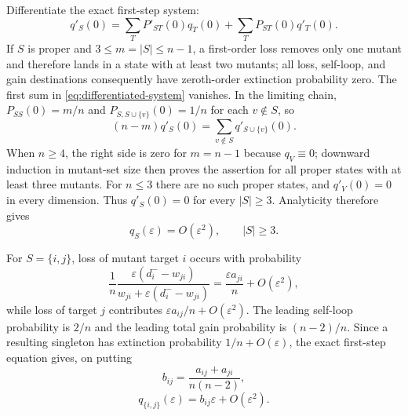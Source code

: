 \documentclass[11pt]{article}
\begin{document}
Differentiate the exact first-step system:
\begin{equation}\label{eq:differentiated-system}
 q'_S(0)=\sum_T P'_{ST}(0)q_T(0)
          +\sum_T P_{ST}(0)q'_T(0).
\end{equation}
If $S$ is proper and $3\le m=|S|\le n-1$, a first-order loss removes only one mutant and therefore lands
in a state with at least two mutants; all loss, self-loop, and gain
destinations consequently have zeroth-order extinction probability zero.
The first sum in \eqref{eq:differentiated-system} vanishes.  In the limiting
chain, $P_{SS}(0)=m/n$ and $P_{S,S\cup\{v\}}(0)=1/n$ for each $v\notin S$, so
\begin{equation}\label{eq:triangular-derivative}
 (n-m)q'_S(0)=\sum_{v\notin S}q'_{S\cup\{v\}}(0).
\end{equation}
When $n\ge4$, the right side is zero for $m=n-1$ because $q_V\equiv0$;
downward induction in mutant-set size then proves the assertion for all proper
states with at least three mutants.  For $n\le3$ there are no such proper
states, and $q'_V(0)=0$ in every dimension.  Thus $q'_S(0)=0$ for every
$|S|\ge3$.  Analyticity
therefore gives
\begin{equation}\label{eq:three-mutant-vanishing}
 q_S(\varepsilon)=O(\varepsilon^2),\qquad |S|\ge3.
\end{equation}

For $S=\{i,j\}$, loss of mutant target $i$ occurs with probability
\[
 \frac1n\frac{\varepsilon(d_i^- -w_{ji})}
 {w_{ji}+\varepsilon(d_i^- -w_{ji})}
 =\frac{\varepsilon a_{ji}}n+O(\varepsilon^2),
\]
while loss of target $j$ contributes $\varepsilon a_{ij}/n+O(\varepsilon^2)$.
The leading self-loop probability is $2/n$ and the
leading total gain probability is $(n-2)/n$.  Since a resulting singleton has
extinction probability $1/n+O(\varepsilon)$, the exact first-step equation
gives, on putting
\[
 b_{ij}=\frac{a_{ij}+a_{ji}}{n(n-2)},
\]
\begin{equation}\label{eq:pair}
 q_{\{i,j\}}(\varepsilon)=b_{ij}\varepsilon+O(\varepsilon^2).
\end{equation}
\end{document}
